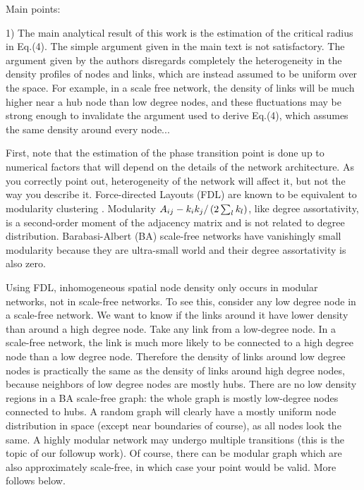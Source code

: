 \documentclass[11pt]{article}
\begin{document}
\noindent
Main points:
\begin{response}{
1) The main analytical result of this work is the estimation of the critical radius in Eq.(4). 
The simple argument given in the main text is not satisfactory. 
The argument given by the authors disregards completely the heterogeneity in the density profiles of nodes and links, which are instead assumed to be uniform over the space. 
For example, in a scale free network, the density of links will be much higher near a hub node than low degree nodes, and these fluctuations may be strong enough to invalidate the argument used to derive Eq.(4), which assumes the same density around every node...

}
First, note that the estimation of the phase transition point is done up to numerical factors that will depend on the details of the network architecture.
As you correctly point out, heterogeneity of the network will affect it, but not the way you describe it. 
Force-directed Layouts (FDL) are known to be equivalent to modularity clustering \cite{noack2009modularity}. 
Modularity $A_{ij}- k_ik_j/\left(2\sum_l k_l\right)$, like degree assortativity, is a  second-order moment of the adjacency matrix and is not related to degree distribution. 
Barabasi-Albert (BA) scale-free networks have vanishingly small modularity because they are ultra-small world and their degree assortativity is also zero.

Using FDL, inhomogeneous spatial node density only occurs in modular networks, not in scale-free networks. 
To see this, consider any low degree node in a scale-free network. 
We want to know if the links around it have lower density than around a high degree node. 
Take any link from a low-degree node.
In a scale-free network, the link is much more likely to be connected to a high degree node than a low degree node. 
Therefore the density of links around low degree nodes is practically the same as the density of links around high degree nodes, because neighbors of low degree nodes are mostly hubs.
There are no low density regions in a BA scale-free graph: the whole graph is mostly low-degree nodes connected to hubs. 
A random graph will clearly have a mostly uniform node distribution in space (except near boundaries of course), as all nodes look the same.
A highly modular network may undergo multiple transitions (this is the topic of our followup work). 
Of course, there can be modular graph  which are also approximately scale-free, in which case your point would be valid.
More follows below. 
\end{response}
\end{document}
